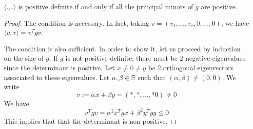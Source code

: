 \documentclass[envcountsame,envcountchap]{svmono}
\begin{document}
\begin{lemma} [Sylvester] 
$\langle ., . \rangle$ is positive definite if and only if all the principal minors of $g$ are positive. 
\end{lemma}
\begin{proof}
The condition is necessary. In fact, taking $v = (v_1, \ldots , v_r , 0, \ldots , 0)$, we have $\langle v, v \rangle = v^T g v$.

The condition is also sufficient. In order to show it, let us proceed by induction on the size of $g$. If $g$ is not positive definite, there must be $2$ negative eigenvalues since the determinant is positive. Let $x \neq 0 \neq y$ be $2$ orthogonal eigenvectors associated to these eigenvalues. Let $\alpha, \beta \in \mathbb{R}$ such that $(\alpha, \beta) \neq (0, 0)$. We write
\begin{equation}
v := \alpha x + \beta y = (*, *, \ldots , * 0 ) \neq 0
\end{equation}   We have
\begin{equation}
v^T g v = \alpha^2 x^T g x + \beta^2 y^T g y \le 0
\end{equation} This implies that that the determinant is non-positive. 
\end{proof}
\end{document}
